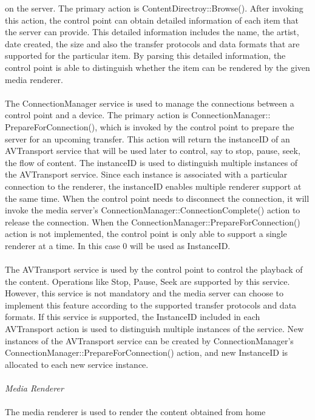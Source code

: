 on the server. The primary action is ContentDirectroy::Browse(). After 
invoking this action, the control point can obtain detailed information of each 
item that the server can provide. This detailed information includes the name, 
the artist, date created, the size and also the transfer protocols and data formats that are
supported for the particular item. By parsing this detailed information, 
the control point is able to distinguish whether the item can be rendered by the 
given media renderer. \\
\\
The ConnectionManager service is used to manage the connections between a 
control point and a device. The primary action is 
ConnectionManager:: PrepareForConnection(), which is invoked by the control 
point to prepare the server for an upcoming transfer. This 
action will return the instanceID of an AVTransport service that will be used 
later to control, say to stop, pause, seek, the flow of content. The instanceID is used to distinguish multiple instances of the AVTransport service. Since each instance is associated with a particular connection to the renderer, the instanceID enables multiple renderer support at the same time. When the 
control point needs to disconnect the connection, it will invoke the media 
server's ConnectionManager::ConnectionComplete() action to release the 
connection. When the ConnectionManager::PrepareForConnection() action is not 
implemented, the control point is only able to support a single renderer at a 
time. In this case 0 will be used as InstanceID. \\
\\
The AVTransport service is used by the control point to control the playback of the 
content. Operations like Stop, Pause, Seek are supported by this service. However, this 
service is not mandatory and the media server can choose to implement this feature 
according to the supported transfer protocols and data formats. If this service 
is supported, the InstanceID included in each AVTransport action is used to 
distinguish multiple instances of the service. New instances of the AVTransport 
service can be created by ConnectionManager's 
ConnectionManager::PrepareForConnection() action, and new InstanceID is 
allocated to each new service instance. \\
\\
\emph{Media Renderer} \\ 
\\
The media renderer is used to render the content obtained from home 
